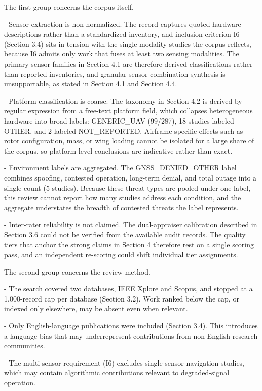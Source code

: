 \documentclass[conference]{IEEEtran}
\begin{document}
The first group concerns the corpus itself.


- Sensor extraction is non-normalized. The record captures quoted hardware descriptions rather than a standardized inventory, and inclusion criterion I6 (Section 3.4) sits in tension with the single-modality studies the corpus reflects, because I6 admits only work that fuses at least two sensing modalities. The primary-sensor families in Section 4.1 are therefore derived classifications rather than reported inventories, and granular sensor-combination synthesis is unsupportable, as stated in Section 4.1 and Section 4.4.

- Platform classification is coarse. The taxonomy in Section 4.2 is derived by regular expression from a free-text platform field, which collapses heterogeneous hardware into broad labels: GENERIC\_UAV (99/287), 18 studies labeled OTHER, and 2 labeled NOT\_REPORTED. Airframe-specific effects such as rotor configuration, mass, or wing loading cannot be isolated for a large share of the corpus, so platform-level conclusions are indicative rather than exact.

- Environment labels are aggregated. The GNSS\_DENIED\_OTHER label combines spoofing, contested operation, long-term denial, and total outage into a single count (5 studies). Because these threat types are pooled under one label, this review cannot report how many studies address each condition, and the aggregate understates the breadth of contested threats the label represents.

- Inter-rater reliability is not claimed. The dual-appraiser calibration described in Section 3.6 could not be verified from the available audit records. The quality tiers that anchor the strong claims in Section 4 therefore rest on a single scoring pass, and an independent re-scoring could shift individual tier assignments.


The second group concerns the review method.


- The search covered two databases, IEEE Xplore and Scopus, and stopped at a 1,000-record cap per database (Section 3.2). Work ranked below the cap, or indexed only elsewhere, may be absent even when relevant.

- Only English-language publications were included (Section 3.4). This introduces a language bias that may underrepresent contributions from non-English research communities.

- The multi-sensor requirement (I6) excludes single-sensor navigation studies, which may contain algorithmic contributions relevant to degraded-signal operation.
\end{document}
